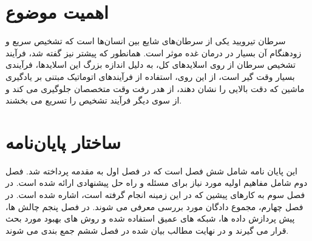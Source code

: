\section{اهمیت موضوع}\label{sec:اهمیت موضوع}
سرطان تیرویید یکی از سرطان‌های شایع بین انسان‌ها است که تشخیص سریع و زودهنگام آن بسیار در درمان غده موثر است.
همانطور که پیشتر نیز گفته شد، فرآیند تشخیص سرطان از روی اسلاید‌های کل، به دلیل اندازه بزرگ این اسلایدها، فرآیندی بسیار وقت گیر است، از این روی، استفاده از فرآیند‌های اتوماتیک مبتنی بر یادگیری ماشین که دقت بالایی را نشان دهند، از هدر رفت وقت متخصصان جلوگیری می کند و از سوی دیگر فرآیند تشخیص را تسریع می بخشند.


\section{ساختار پایان‌نامه}\label{sec:ساختار پایان‌نامه}
این پایان نامه شامل شش فصل است که در فصل اول به مقدمه پرداخته شد.
فصل دوم شامل مفاهیم اولیه مورد نیاز برای مسئله و راه حل پیشنهادی ارائه شده است.
در فصل سوم به کارهای پیشین که در این زمینه انجام گرفته است، اشاره شده است.
در فصل چهارم، مجموع دادگان مورد بررسی معرفی می شوند.
در فصل پنجم چالش ها، پیش پردازش داده ها، شبکه های عمیق استفاده شده و روش های بهبود مورد بحث قرار می گیرند و در نهایت مطالب بیان شده در فصل ششم جمع بندی می شوند.
 


